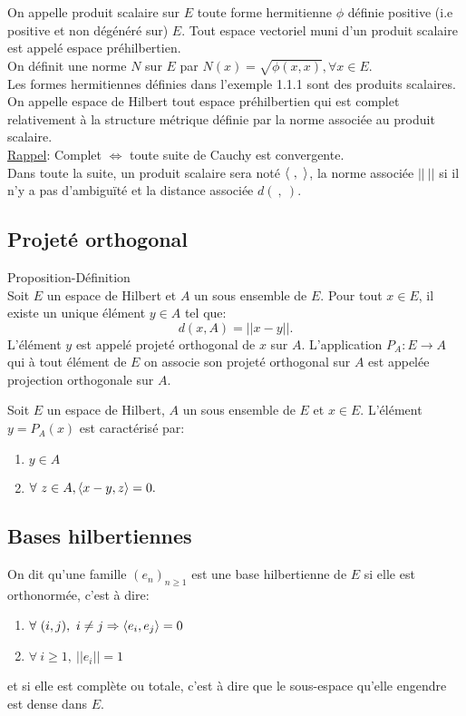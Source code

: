 \bdfn
$ $\\
On appelle produit scalaire sur $E$ toute forme hermitienne $ \phi$ définie positive (i.e positive et non dégénéré sur) $E$. Tout espace vectoriel muni d'un produit scalaire est appelé espace préhilbertien.
\\On définit une norme $N$ sur $ E $ par $N(x) = \sqrt{\phi(x,x)}, \forall x \in E.$
\edfn
\bex
$ $\\
Les formes hermitiennes définies dans l'exemple 1.1.1 sont des produits scalaires.
\eex
$ $
On appelle espace de Hilbert tout espace préhilbertien qui est complet relativement à la structure métrique définie par la norme associée au produit scalaire.
\\\ul{Rappel}: Complet $\Leftrightarrow$ toute suite de Cauchy est convergente.
\\$ $
\\Dans toute la suite, un produit scalaire sera noté $\langle\ ,\ \rangle$, la norme associée $||\ ||$ si il n'y a pas d'ambiguïté et la distance associée $d(\ ,\ )$.

\subsection{Projeté orthogonal}
\bprop Proposition-Définition
\\Soit $E$ un espace de Hilbert et $A$ un sous ensemble de $E$. Pour tout $x \in E$, il existe un unique élément $y\in A$ tel que: $$ d(x,A)=||x-y||.$$
L'élément $y$ est appelé projeté orthogonal de $x$ sur $A$. L'application $P_A:E \longrightarrow A$ qui à tout élément de $E$ on associe son projeté orthogonal sur $A$ est appelée projection orthogonale sur $A$. 
\eprop

\bprop
$ $\\
Soit $E$ un espace de Hilbert, $A$ un sous ensemble de $E$ et $x\in E$. L'élément $y=P_A(x)$ est caractérisé par:
\begin{enumerate}
\item $y\in A$
\item $\forall \ z \in A, \langle x-y,z\rangle=0.$
\end{enumerate}
\eprop

\subsection{Bases hilbertiennes}
\bdfn
$ $\\On dit qu'une famille $(e_n)_{n\geqslant 1}$ est une base hilbertienne de $E$ si elle est orthonormée, c'est à dire:
\begin{enumerate}
\item $ \forall \ (i,j),\  i \neq j \Rightarrow \langle e_i ,e_j \rangle = 0 $
\item $ \forall \ i \geqslant 1,\  || e_i ||=1 $ 
\end{enumerate}
et si elle est complète ou totale, c'est à dire que le sous-espace qu'elle engendre est dense dans $E$.
\edfn

